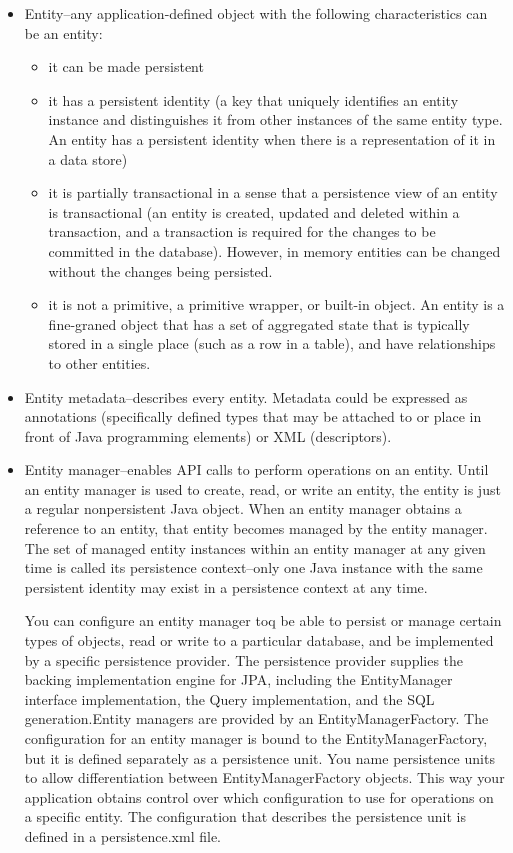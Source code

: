 \begin{itemize}
\item Entity–any application-defined object with the following characteristics can be an entity:

\begin{itemize}
\item it can be made persistent

\item it has a persistent identity (a key that uniquely identifies an entity
instance and distinguishes it from other instances of the same entity type. An
entity has a persistent identity when there is a representation of it in a data
store)

\item it is partially transactional in a sense that a persistence view of an
entity is transactional (an entity is created, updated and deleted within a
transaction, and a transaction is required for the changes to be committed in the
database). However, in memory entities can be changed without the changes being
persisted.
\item it is not a primitive, a primitive wrapper, or built-in object.
An entity is a fine-graned object that has a set of aggregated state that is
typically stored in a single place (such as a row in a table), and have
relationships to other entities.
\end{itemize}

\item Entity metadata–describes every entity. Metadata could be expressed as
annotations (specifically defined types that may be attached to or place in front
of Java programming elements) or XML (descriptors).
\item Entity manager–enables
API calls to perform operations on an entity. Until an entity manager is used to
create, read, or write an entity, the entity is just a regular nonpersistent Java
object. When an entity manager obtains a reference to an entity, that entity
becomes managed by the entity manager. The set of managed entity instances within
an entity manager at any given time is called its persistence context–only one
Java instance with the same persistent identity may exist in a persistence
context at any time.

You can configure an entity manager toq be able to persist or manage certain
types of objects, read or write to a particular database, and be implemented by a
specific persistence provider. The persistence provider supplies the backing
implementation engine for JPA, including the EntityManager interface
implementation, the Query implementation, and the SQL generation.Entity managers
are provided by an EntityManagerFactory. The configuration for an entity manager
is bound to the EntityManagerFactory, but it is defined separately as a
persistence unit. You name persistence units to allow differentiation between
EntityManagerFactory objects. This way your application obtains control over
which configuration to use for operations on a specific entity. The configuration
that describes the persistence unit is defined in a persistence.xml file.


\end{itemize}

